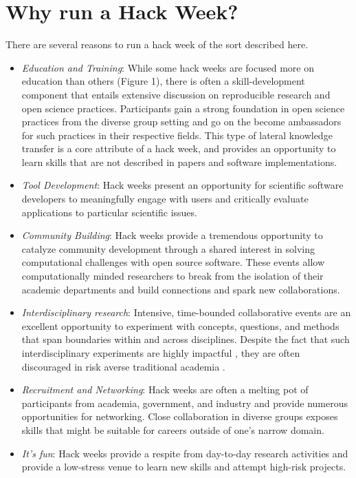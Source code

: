 \section*{Why run a Hack Week?}

There are several reasons to run a hack week of the sort described here.

\begin{itemize}
\item{\textit{Education and Training}: %
While some hack weeks are focused more on education than others (Figure 1), there is often a skill-development component that entails extensive discussion on reproducible research and open science practices. Participants gain a strong foundation in open science practices from the diverse group setting and go on the become ambassadors for such practices in their respective fields. This type of lateral knowledge transfer is a core attribute of a hack week, and provides an opportunity to learn skills that are not described in papers and software implementations.}

\item{\textit{Tool Development}: Hack weeks present an opportunity for scientific software developers to meaningfully engage with users and critically evaluate applications to particular scientific issues.}

\item{\textit{Community Building}: Hack weeks provide a tremendous opportunity to catalyze community development through a shared interest in solving computational challenges with open source software. These events allow computationally minded researchers to break from the isolation of their academic departments and build connections and spark new collaborations.}


\item{\textit{Interdisciplinary research}: Intensive, time-bounded collaborative events are an excellent opportunity to experiment with concepts, questions, and methods that span boundaries within and across disciplines. Despite the fact that such interdisciplinary experiments are highly impactful \cite{Hall2012-hi}, they are often discouraged in risk averse traditional academia \cite{Sung2003-go, Rhoten2004-fk}}.

\item{\textit{Recruitment and Networking}: Hack weeks are often a melting pot of participants from academia, government, and industry and provide numerous opportunities for networking. Close collaboration in diverse groups exposes skills that might be suitable for careers outside of one's narrow domain.}

\item{\textit{It's fun}: Hack weeks provide a respite from day-to-day research activities and provide a low-stress venue to learn new skills and attempt high-risk projects.}

\end{itemize}



